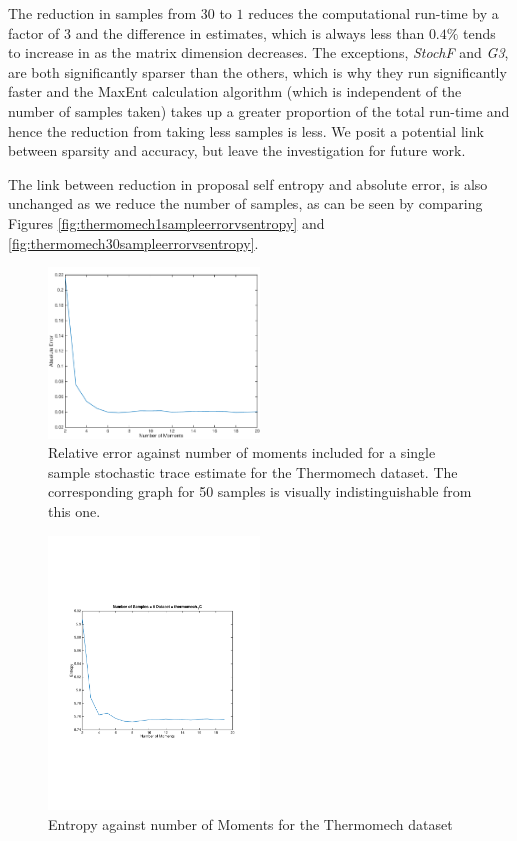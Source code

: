 \documentclass[journal]{IEEEtran}
\begin{document}
	The reduction in samples from $30$ to $1$ reduces the computational run-time by a factor of $3$ and the difference in estimates, which is always less than $0.4\%$ tends to increase in as the matrix dimension decreases. The exceptions, \textit{StochF} and \textit{G3}, are both significantly sparser than the others, which is why they run significantly faster and the MaxEnt calculation algorithm (which is independent of the number of samples taken) takes up a greater proportion of the total run-time and hence the reduction from taking less samples is less. We posit a potential link between sparsity and accuracy, but leave the investigation for future work.
	
	The link between reduction in proposal self entropy and absolute error, is also unchanged as we reduce the number of samples, as can be seen by comparing Figures \ref{fig:thermomech1sampleerrorvsentropy} and \ref{fig:thermomech30sampleerrorvsentropy}.
	
	
	
	\begin{figure}[t]
		\centering 
		\includegraphics[width=0.5\textwidth]{thermo1smpmomer-cropped}
		\caption{Relative error against number of moments included for a single sample stochastic trace estimate for the Thermomech dataset. The corresponding graph for 50 samples is visually indistinguishable from this one.}
		\label{fig:thermomech1sampleerrorvsmoments}
	\end{figure}
	\begin{figure}[t]
		\centering 
		\includegraphics[width=0.5\textwidth]{cropped_thermomomentsentr}
		\caption{Entropy against number of Moments for the Thermomech dataset}
		\label{fig:thermoentropyvsmoments}
	\end{figure}
	
\end{document}
